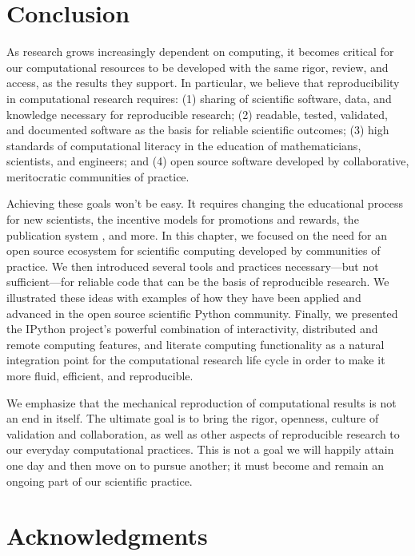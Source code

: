 \documentclass[11pt,oneside,english]{article}
\begin{document}
\section{Conclusion}\label{conclusion}

As research grows increasingly dependent on computing, it becomes critical for
our computational resources to be developed with the same rigor, review,
and access, as the results they support. In particular, we believe that
reproducibility in computational research requires: (1) sharing of scientific
software, data, and knowledge necessary for reproducible research; (2)
readable, tested, validated, and documented software as the basis for reliable
scientific outcomes; (3) high standards of computational literacy in the
education of mathematicians, scientists, and engineers; and (4) open source
software developed by collaborative, meritocratic communities of practice.

Achieving these goals won't be easy.  It requires changing the educational
process for new scientists, the incentive models for promotions and rewards,
the publication system \cite{neylon2012changing}, and more. In this chapter, we
focused on the need for an open source ecosystem for scientific computing
developed by communities of practice.  We then introduced several tools and
practices necessary---but not sufficient---for reliable code that can be the
basis of reproducible research.  We illustrated these ideas with examples of
how they have been applied and advanced in the open source scientific Python
community.  Finally, we presented the IPython project's powerful combination of
interactivity, distributed and remote computing features, and literate
computing functionality as a natural integration point for the computational
research life cycle in order to make it more fluid, efficient, and
reproducible.

We emphasize that the mechanical reproduction of computational results
is not an end in itself.  The ultimate goal is to bring the rigor, openness,
culture of validation and collaboration, as well as other aspects of
reproducible research to our everyday computational practices. This is not a
goal we will happily attain one day and then move on to pursue another;
it must become and remain an ongoing part of our scientific practice.

\section*{Acknowledgments}
\end{document}
